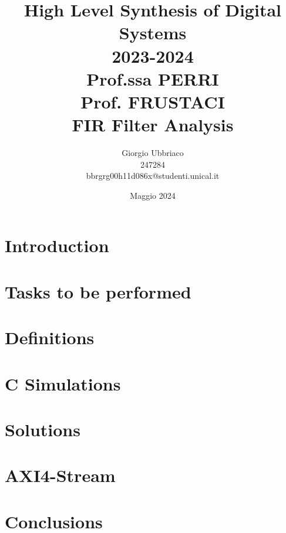 \documentclass{article}
\title{High Level Synthesis of Digital Systems\\2023-2024\\Prof.ssa PERRI\\Prof. FRUSTACI\\FIR Filter Analysis}
\author{Giorgio Ubbriaco \\ 247284 \\ bbrgrg00h11d086x@studenti.unical.it}
\date{Maggio 2024}
\begin{document}
    \maketitle
    \renewcommand{\contentsname}{Index}
    \tableofcontents
    \newpage

    \lstlistoflistings
    \listoffigures
    \listoftables
    \newpage
    
    \section{Introduction}
    
    \newpage
    
    \section{Tasks to be performed}
    
    \newpage

    \section{Definitions}
    
    \newpage

    \section{C Simulations}
    
    \newpage
    
    \section{Solutions}
    
    \newpage
    
    \section{AXI4-Stream}
    
    \newpage

    \section{Conclusions}
    
    \newpage
    
\end{document}
